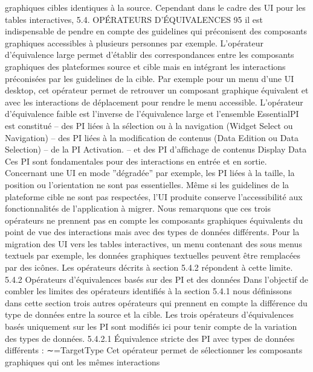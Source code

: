 \documentclass{article}
\begin{document}
graphiques cibles identiques \`{a} la source. Cependant dans le cadre des UI pour les tables interactives,
5.4. OPÉRATEURS D’ÉQUIVALENCES
95
il est indispensable de pendre en compte des guidelines qui pr\'{e}conisent des composants graphiques
accessibles \`{a} plusieurs personnes par exemple.
L’op\'{e}rateur d’\'{e}quivalence large permet d’\'{e}tablir des correspondances entre les composants graphiques des plateformes source et cible mais en int\'{e}grant les interactions pr\'{e}conis\'{e}es par les guidelines de la cible. Par exemple pour un menu d’une UI desktop, cet op\'{e}rateur permet de retrouver un
composant graphique \'{e}quivalent et avec les interactions de d\'{e}placement pour rendre le menu accessible.
L’op\'{e}rateur d’\'{e}quivalence faible est l’inverse de l’\'{e}quivalence large et l’ensemble EssentialPI est
constitu\'{e}
– des PI li\'{e}es \`{a} la s\'{e}lection ou \`{a} la navigation (Widget Select ou Navigation)
– des PI li\'{e}es \`{a} la modiﬁcation de contenus (Data Edition ou Data Selection)
– de la PI Activation.
– et des PI d’afﬁchage de contenus Display Data
Ces PI sont fondamentales pour des interactions en entr\'{e}e et en sortie. Concernant une UI en mode
”d\'{e}grad\'{e}e” par exemple, les PI li\'{e}es \`{a} la taille, la position ou l’orientation ne sont pas essentielles.
M\^{e}me si les guidelines de la plateforme cible ne sont pas respect\'{e}es, l’UI produite conserve l’accessibilit\'{e} aux fonctionnalit\'{e}s de l’application \`{a} migrer.
Nous remarquons que ces trois op\'{e}rateurs ne prennent pas en compte les composants graphiques
\'{e}quivalents du point de vue des interactions mais avec des types de donn\'{e}es diff\'{e}rents. Pour la migration des UI vers les tables interactives, un menu contenant des sous menus textuels par exemple,
les donn\'{e}es graphiques textuelles peuvent \^{e}tre remplac\'{e}es par des ic\^{o}nes. Les op\'{e}rateurs d\'{e}crits \`{a}
section 5.4.2 r\'{e}pondent \`{a} cette limite.
5.4.2
Op\'{e}rateurs d’\'{e}quivalences bas\'{e}s sur des PI et des donn\'{e}es
Dans l’objectif de combler les limites des op\'{e}rateurs identiﬁ\'{e}s \`{a} la section 5.4.1 nous d\'{e}ﬁnissons
dans cette section trois autres op\'{e}rateurs qui prennent en compte la diff\'{e}rence du type de donn\'{e}es entre
la source et la cible. Les trois op\'{e}rateurs d’\'{e}quivalences bas\'{e}s uniquement sur les PI sont modiﬁ\'{e}s ici
pour tenir compte de la variation des types de donn\'{e}es.
5.4.2.1
Équivalence stricte des PI avec types de donn\'{e}es diff\'{e}rents : ∼=TargetType
Cet op\'{e}rateur permet de s\'{e}lectionner les composants graphiques qui ont les m\^{e}mes interactions
\end{document}

